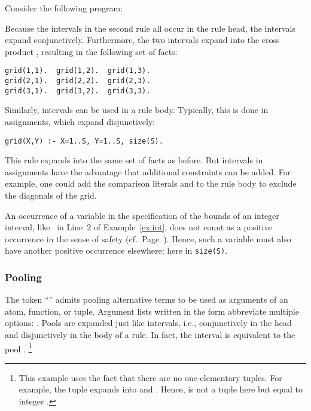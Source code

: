 \begin{example}\label{ex:int}
Consider the following program:

Because the intervals in the second rule all occur in the rule head,
the intervals expand conjunctively.
Furthermore, the two intervals expand into the cross product ,
resulting in the following set of facts:
\begin{lstlisting}[numbers=none]
grid(1,1).  grid(1,2).  grid(1,3).
grid(2,1).  grid(2,2).  grid(2,3).
grid(3,1).  grid(3,2).  grid(3,3).
\end{lstlisting}
Similarly, intervals can be used in a rule body.
Typically, this is done in assignments, which expand disjunctively:
\begin{lstlisting}[firstnumber=2]
grid(X,Y) :- X=1..S, Y=1..S, size(S).
\end{lstlisting}
This rule expands into the same set of facts as before.
But intervals in assignments have the advantage that additional constraints can be added.
For example, one could add the comparison literals  and 
to the rule body to exclude the diagonals of the grid.
\eexample
\end{example}

\begin{note}
An occurrence of a variable in the specification of the bounds
of an integer interval, like~ in Line~2 of Example~\ref{ex:int}, 
does not count as a positive occurrence
in the sense of safety (cf.\ Page~\pageref{pg:safe}).
Hence, such a variable must also have another positive occurrence elsewhere;
here in \lstinline{size(S)}.
%
\end{note}

\subsubsection{Pooling}\label{subsec:gringo:pool}

The token ``\code{;}'' admits pooling alternative terms
to be used as arguments of an atom, function, or tuple. %
Argument lists written in the form  abbreviate multiple options:
.
Pools are expanded just like intervals, i.e.,
conjunctively in the head and disjunctively in the body of a rule.
In fact, the interval  is equivalent to the pool .%
\footnote{%
This example uses the fact that there are no one-elementary tuples.
For example, the tuple  expands into  and .
Hence,  is not a tuple here but equal to integer .}

